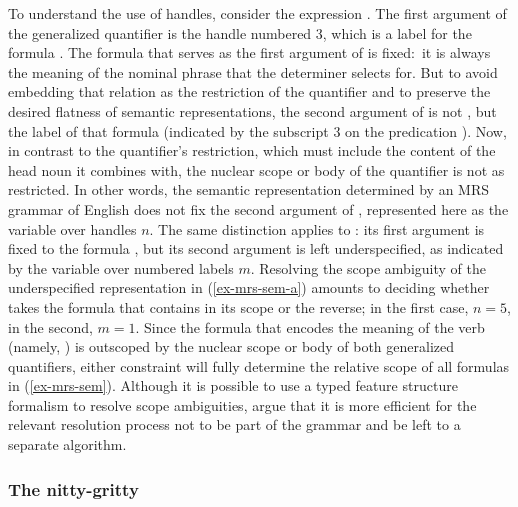 \documentclass[output=paper]{langsci/langscibook}
\begin{document}
To understand the use of handles, consider the expression . The first argument of the generalized quantifier is the handle numbered 3, which is a label for the formula . The formula that serves as the first argument of  is fixed:\ it is always the meaning of the nominal phrase that the determiner selects for. But to avoid embedding that relation as the restriction of the quantifier and to preserve the desired flatness of semantic representations, the second argument of  is not , but the label of that formula (indicated by the subscript $3$ on the predication ). Now, in contrast to the quantifier's restriction, which must include the content of the head noun it combines with, the nuclear scope or body of the quantifier is not as restricted. In other words, the semantic representation determined by an MRS grammar of English does not fix the second argument of , represented here as the variable over handles $n$. The same distinction applies to : its first argument is fixed to the formula , but its second argument is left underspecified, as indicated by the variable over numbered labels $m$. Resolving the scope ambiguity of the underspecified representation in (\ref{ex-mrs-sem-a}) amounts to deciding whether  takes the formula that contains  in its scope or the reverse; in the first case, $n=5$, in the second, $m=1$. Since the formula that encodes the meaning of the verb (namely, \mbox{)} is outscoped by the nuclear scope or body of both generalized quantifiers, either constraint will fully determine the relative scope of all formulas in (\ref{ex-mrs-sem}). Although it is possible to use a typed feature structure formalism to resolve scope ambiguities, \citet[309--311]{Copestakeetal1995} argue that it is more efficient for the relevant resolution process not to be part of the grammar and be left to a separate algorithm.



\subsubsection{The nitty-gritty}
\end{document}
